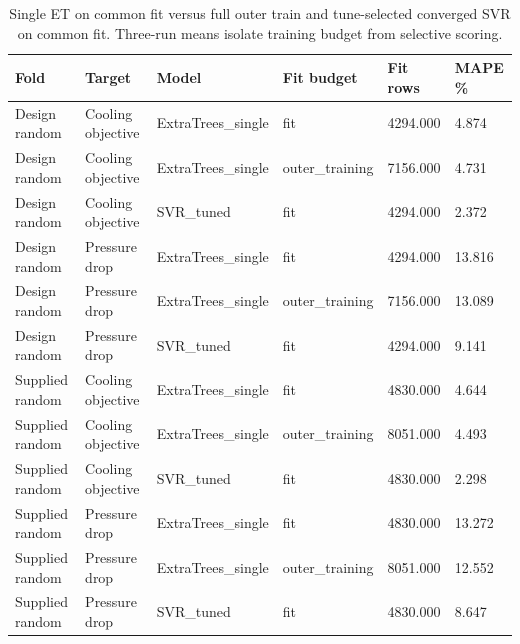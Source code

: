 \begin{table}[htbp]\centering\small\setlength{\tabcolsep}{3pt}\begin{tabular}{llllll}
\toprule
Fold & Target & Model & Fit budget & Fit rows & MAPE \%\\\midrule
Design random & Cooling objective & ExtraTrees\_single & fit & 4294.000 & 4.874\\
Design random & Cooling objective & ExtraTrees\_single & outer\_training & 7156.000 & 4.731\\
Design random & Cooling objective & SVR\_tuned & fit & 4294.000 & 2.372\\
Design random & Pressure drop & ExtraTrees\_single & fit & 4294.000 & 13.816\\
Design random & Pressure drop & ExtraTrees\_single & outer\_training & 7156.000 & 13.089\\
Design random & Pressure drop & SVR\_tuned & fit & 4294.000 & 9.141\\
Supplied random & Cooling objective & ExtraTrees\_single & fit & 4830.000 & 4.644\\
Supplied random & Cooling objective & ExtraTrees\_single & outer\_training & 8051.000 & 4.493\\
Supplied random & Cooling objective & SVR\_tuned & fit & 4830.000 & 2.298\\
Supplied random & Pressure drop & ExtraTrees\_single & fit & 4830.000 & 13.272\\
Supplied random & Pressure drop & ExtraTrees\_single & outer\_training & 8051.000 & 12.552\\
Supplied random & Pressure drop & SVR\_tuned & fit & 4830.000 & 8.647\\
\bottomrule\end{tabular}\caption{Single ET on common fit versus full outer train and tune-selected converged SVR on common fit. Three-run means isolate training budget from selective scoring.}\label{tab:ubend-fit_budget}\end{table}

